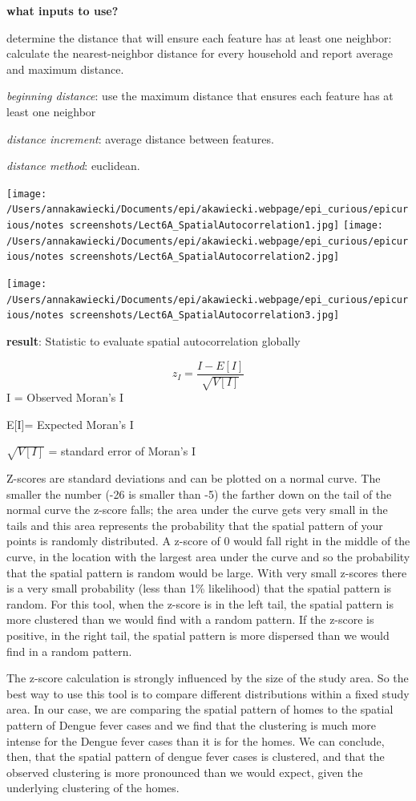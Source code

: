 \documentclass[
]{article}
\begin{document}
\textbf{what inputs to use?}

determine the distance that will ensure each feature has at least one
neighbor: calculate the nearest-neighbor distance for every household
and report average and maximum distance.

\emph{beginning distance}: use the maximum distance that ensures each
feature has at least one neighbor

\emph{distance increment}: average distance between features.

\emph{distance method}: euclidean.

\texttt{[image: /Users/annakawiecki/Documents/epi/akawiecki.webpage/epi\_curious/epicurious/notes screenshots/Lect6A\_SpatialAutocorrelation1.jpg]}
\texttt{[image: /Users/annakawiecki/Documents/epi/akawiecki.webpage/epi\_curious/epicurious/notes screenshots/Lect6A\_SpatialAutocorrelation2.jpg]}

\texttt{[image: /Users/annakawiecki/Documents/epi/akawiecki.webpage/epi\_curious/epicurious/notes screenshots/Lect6A\_SpatialAutocorrelation3.jpg]}

\textbf{result}: Statistic to evaluate spatial autocorrelation globally

\[z_I = \frac{I-E[I]}{\sqrt{V[I]}}\] I = Observed Moran's I

E{[}I{]}= Expected Moran's I

\(\sqrt{V[I]}\) = standard error of Moran's I

Z-scores are standard deviations and can be plotted on a normal curve.
The smaller the number (-26 is smaller than -5) the farther down on the
tail of the normal curve the z-score falls; the area under the curve
gets very small in the tails and this area represents the probability
that the spatial pattern of your points is randomly distributed. A
z-score of 0 would fall right in the middle of the curve, in the
location with the largest area under the curve and so the probability
that the spatial pattern is random would be large. With very small
z-scores there is a very small probability (less than 1\% likelihood)
that the spatial pattern is random. For this tool, when the z-score is
in the left tail, the spatial pattern is more clustered than we would
find with a random pattern. If the z-score is positive, in the right
tail, the spatial pattern is more dispersed than we would find in a
random pattern.

The z-score calculation is strongly influenced by the size of the study
area. So the best way to use this tool is to compare different
distributions within a fixed study area. In our case, we are comparing
the spatial pattern of homes to the spatial pattern of Dengue fever
cases and we find that the clustering is much more intense for the
Dengue fever cases than it is for the homes. We can conclude, then, that
the spatial pattern of dengue fever cases is clustered, and that the
observed clustering is more pronounced than we would expect, given the
underlying clustering of the homes.
\end{document}
